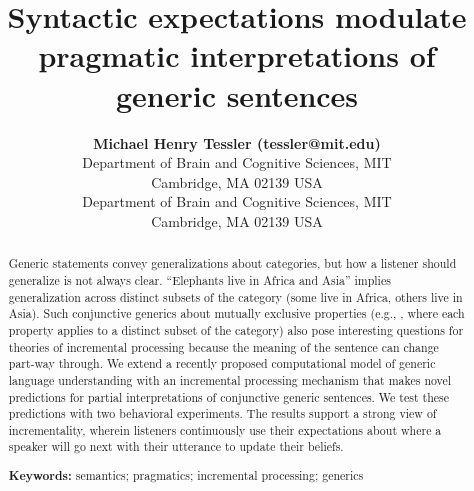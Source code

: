 \documentclass[10pt,letterpaper]{article}
\title{Syntactic expectations modulate pragmatic interpretations of generic sentences}
\author{{\large \bf Michael Henry Tessler (tessler@mit.edu)} \\
  Department of Brain and Cognitive Sciences, MIT \\
  Cambridge, MA 02139 USA
  \AND {\large \bf Roger Levy (rplevy@mit.edu)} \\
  Department of Brain and Cognitive Sciences, MIT \\
  Cambridge, MA 02139 USA}
\begin{document}
\maketitle


\begin{abstract}


Generic statements convey generalizations about categories, but  how a listener should generalize is not always clear.  
``Elephants live in Africa and Asia'' implies generalization across distinct subsets of the category (some live in Africa, others live in Asia).
Such conjunctive generics about mutually exclusive properties (e.g., , where each property applies to a distinct subset of the category) also pose interesting questions for theories of incremental processing because the meaning of the sentence can change part-way through. 
We extend a recently proposed computational model of generic language understanding with an incremental processing mechanism that makes novel predictions for partial interpretations of conjunctive generic sentences.
We test these predictions with two behavioral experiments. The results support a strong view of incrementality, wherein listeners  continuously use their expectations about where a speaker will go next with their utterance to update their beliefs.



\textbf{Keywords:} 
semantics; pragmatics; incremental processing; generics
\end{abstract}
\end{document}
